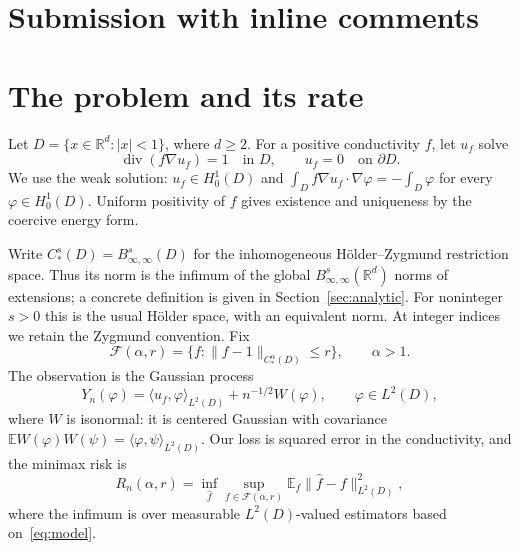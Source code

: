 \documentclass[11pt]{article}
\theoremstyle{remark}
\newcommand{\R}{\mathbb R}
\newcommand{\E}{\mathbb E}
\newcommand{\cF}{\mathcal F}
\newcommand{\diver}{\operatorname{div}}
\newcommand{\norm}[1]{\lVert #1\rVert}
\newcommand{\abs}[1]{\lvert #1\rvert}
\newcommand{\ip}[2]{\langle #1,#2\rangle}
\begin{document}
\newpage
\section{Submission with inline comments}


\begin{abstract}
We consider recovery of a conductivity from a single solution of Darcy's equation on the unit ball, observed in Gaussian white noise of variance $n^{-1}$. For a sufficiently small fixed H\"older--Zygmund ball of smoothness $\alpha>1$ around the constant conductivity, we prove that the minimax squared $L^2$ risk has polynomial order $n^{-2\alpha/(2\alpha+d+3)}$ in every dimension $d\ge2$. The upper bound differs from the lower bound by at most $(\log n)^2$. The parameter class includes integer smoothness indices and has no prescribed conductivity trace. The lower bound uses localized angular perturbations and uniform nonlinear comparison. For the upper bound, inversion along a contracting gradient flow yields an integrated variance estimate that remains valid at the interior critical point. An independent pilot, a finite-dimensional correction, and boundary extrapolation give an estimator on the whole ball.
\end{abstract}

\section{The problem and its rate}
Let $D=\{x\in\R^d:\abs{x}<1\}$, where $d\ge2$. For a positive conductivity $f$, let $u_f$ solve
\begin{equation}\label{eq:pde}
 \diver(f\nabla u_f)=1\quad\text{in }D,
 \qquad u_f=0\quad\text{on }\partial D.
\end{equation}
We use the weak solution: $u_f\in H_0^1(D)$ and
$\int_D f\nabla u_f\cdot\nabla\varphi=-\int_D\varphi$ for every $\varphi\in H_0^1(D)$.
Uniform positivity of $f$ gives existence and uniqueness by the coercive energy form.

Write $C_*^s(D)=B^s_{\infty,\infty}(D)$ for the inhomogeneous H\"older--Zygmund restriction space. Thus its norm is the infimum of the global $B^s_{\infty,\infty}(\R^d)$ norms of extensions; a concrete definition is given in Section~\ref{sec:analytic}. For noninteger $s>0$ this is the usual H\"older space, with an equivalent norm. At integer indices we retain the Zygmund convention. Fix
\begin{equation}\label{eq:class}
 \cF(\alpha,r)=\{f:\norm{f-1}_{C_*^\alpha(D)}\le r\},
 \qquad \alpha>1.
\end{equation}
The observation is the Gaussian process
\begin{equation}\label{eq:model}
 Y_n(\varphi)=\ip{u_f}{\varphi}_{L^2(D)}+n^{-1/2}W(\varphi),
 \qquad \varphi\in L^2(D),
\end{equation}
where $W$ is isonormal: it is centered Gaussian with covariance
$\E W(\varphi)W(\psi)=\ip{\varphi}{\psi}_{L^2(D)}$.
Our loss is squared error in the conductivity, and the minimax risk is
\[
 R_n(\alpha,r)=\inf_{\widehat f}\sup_{f\in\cF(\alpha,r)}
 \E_f\norm{\widehat f-f}_{L^2(D)}^2,
\]
where the infimum is over measurable $L^2(D)$-valued estimators based on~\eqref{eq:model}.
\end{document}
